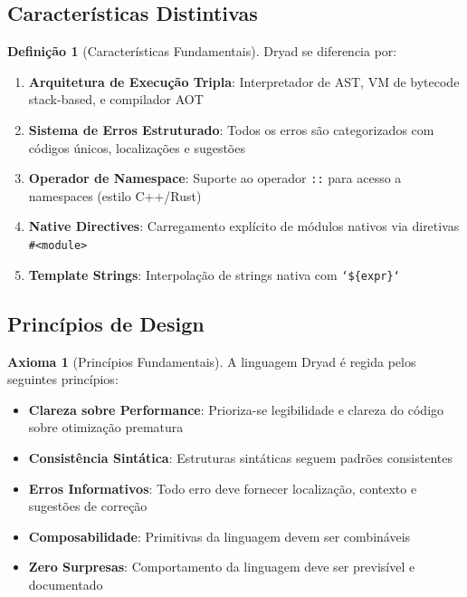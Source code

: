 \documentclass[12pt,a4paper]{article}
\theoremstyle{definition}
\newtheorem{definition}{Definição}[section]
\newtheorem{axiom}{Axioma}[section]
\begin{document}
\subsection{Características Distintivas}

\begin{definition}[Características Fundamentais]
Dryad se diferencia por:
\begin{enumerate}
    \item \textbf{Arquitetura de Execução Tripla}: Interpretador de AST, VM de bytecode stack-based, e compilador AOT
    \item \textbf{Sistema de Erros Estruturado}: Todos os erros são categorizados com códigos únicos, localizações e sugestões
    \item \textbf{Operador de Namespace}: Suporte ao operador \texttt{::} para acesso a namespaces (estilo C++/Rust)
    \item \textbf{Native Directives}: Carregamento explícito de módulos nativos via diretivas \texttt{\#<module>}
    \item \textbf{Template Strings}: Interpolação de strings nativa com \texttt{`\$\{expr\}`}
\end{enumerate}
\end{definition}

\subsection{Princípios de Design}

\begin{axiom}[Princípios Fundamentais]
A linguagem Dryad é regida pelos seguintes princípios:
\begin{itemize}
    \item \textbf{Clareza sobre Performance}: Prioriza-se legibilidade e clareza do código sobre otimização prematura
    \item \textbf{Consistência Sintática}: Estruturas sintáticas seguem padrões consistentes
    \item \textbf{Erros Informativos}: Todo erro deve fornecer localização, contexto e sugestões de correção
    \item \textbf{Composabilidade}: Primitivas da linguagem devem ser combináveis
    \item \textbf{Zero Surpresas}: Comportamento da linguagem deve ser previsível e documentado
\end{itemize}
\end{axiom}
\end{document}
